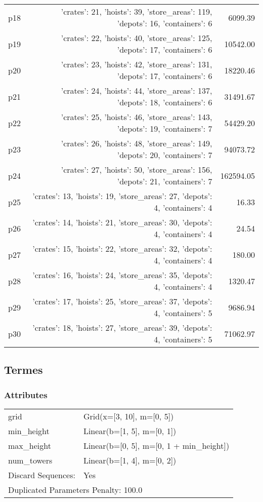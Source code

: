 \documentclass{article}
\begin{document}
\begin{center}
\begin{tabular}{@{}l|r|r@{}}
  p18&{'crates': 21, 'hoists': 39, 'store\_areas': 119, 'depots': 16, 'containers': 6}&6099.39\\
  p19&{'crates': 22, 'hoists': 40, 'store\_areas': 125, 'depots': 17, 'containers': 6}&10542.00\\
  p20&{'crates': 23, 'hoists': 42, 'store\_areas': 131, 'depots': 17, 'containers': 6}&18220.46\\
  p21&{'crates': 24, 'hoists': 44, 'store\_areas': 137, 'depots': 18, 'containers': 6}&31491.67\\
  p22&{'crates': 25, 'hoists': 46, 'store\_areas': 143, 'depots': 19, 'containers': 7}&54429.20\\
  p23&{'crates': 26, 'hoists': 48, 'store\_areas': 149, 'depots': 20, 'containers': 7}&94073.72\\
  p24&{'crates': 27, 'hoists': 50, 'store\_areas': 156, 'depots': 21, 'containers': 7}&162594.05\\
  p25&{'crates': 13, 'hoists': 19, 'store\_areas': 27, 'depots': 4, 'containers': 4}&16.33\\
  p26&{'crates': 14, 'hoists': 21, 'store\_areas': 30, 'depots': 4, 'containers': 4}&24.54\\
  p27&{'crates': 15, 'hoists': 22, 'store\_areas': 32, 'depots': 4, 'containers': 4}&180.00\\
  p28&{'crates': 16, 'hoists': 24, 'store\_areas': 35, 'depots': 4, 'containers': 4}&1320.47\\
  p29&{'crates': 17, 'hoists': 25, 'store\_areas': 37, 'depots': 4, 'containers': 5}&9686.94\\
  p30&{'crates': 18, 'hoists': 27, 'store\_areas': 39, 'depots': 4, 'containers': 5}&71062.97
                            \end{tabular}
                            \end{center}
                    
                            \newpage \subsection{Termes}
                    \subsubsection*{Attributes}
                    \begin{tabular}{@{}p{}p{}@{}}
                    \toprule
                    grid & Grid(x=[3, 10], m=[0, 5])\\
min\_height & Linear(b=[1, 5], m=[0, 1])\\
max\_height & Linear(b=[0, 5], m=[0, 1 + min\_height])\\
num\_towers & Linear(b=[1, 4], m=[0, 2])
                                \\\midrule
                                Discard Sequences: & Yes \\
                    \bottomrule
                    \multicolumn{2}{l}{Duplicated Parameters Penalty: 100.0}
                    \end{tabular}
                
\end{document}
